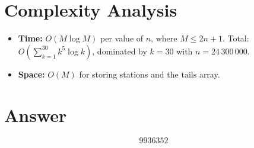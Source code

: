 \documentclass[11pt]{article}
\begin{document}
\section{Complexity Analysis}

\begin{itemize}
  \item \textbf{Time:} $O(M \log M)$ per value of $n$, where $M \le 2n+1$. Total: $O\!\left(\sum_{k=1}^{30} k^5 \log k\right)$, dominated by $k = 30$ with $n = 24\,300\,000$.
  \item \textbf{Space:} $O(M)$ for storing stations and the $\mathrm{tails}$ array.
\end{itemize}

\section{Answer}

\[
\boxed{9936352}
\]
\end{document}

